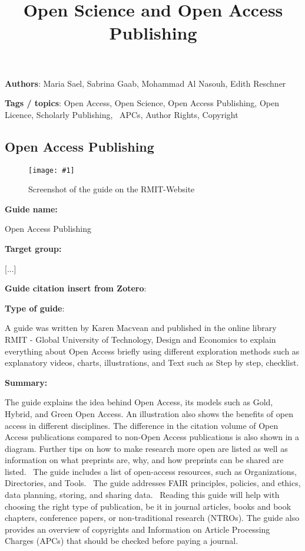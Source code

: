 \documentclass{article}
\newlength{\imgwidth}
\newcommand\scaledgraphics[2]{%
                
\settowidth{\imgwidth}{\texttt{[image: \#1]}}%
                
\setlength{\imgwidth}{\minof{\imgwidth}{#2\textwidth}}%
                
\texttt{[image: \#1]}%
                
}
\begin{document}
\title{Open Science and Open Access Publishing }

\maketitle





\textbf{Authors}: Maria Sael, Sabrina Gaab, Mohammad Al Nasouh, Edith Reschner


\textbf{Tags / topics}: Open Access, Open Science, Open Access Publishing, Open Licence, Scholarly Publishing,  APCs, Author Rights, Copyright





\subsection{Open Access Publishing}\label{H7151279}


\begin{figure}
\scaledgraphics{dec17709-06cd-4c04-b217-1e1f0b7a42cc.png}{1}
\caption*{Screenshot of the guide on the RMIT-Website}\label{F16639041}
\end{figure}




\textbf{Guide name:} 

Open Access Publishing


\textbf{Target group:}

[...]


\textbf{Guide citation insert from Zotero}:

\autocite{macvean_all_2021} 


\textbf{Type of guide}: 

A guide was written by Karen Macvean and published in the online library RMIT - Global University of Technology, Design and Economics to explain everything about Open Access briefly using different exploration methods such as explanatory videos, charts, illustrations, and Text such as Step by step, checklist. 


\textbf{Summary:} 

The guide explains the idea behind Open Access, its models such as Gold, Hybrid, and Green Open Access. An illustration also shows the benefits of open access in different disciplines. The difference in the citation volume of Open Access publications compared to non-Open Access publications is also shown in a diagram. Further tips on how to make research more open are listed as well as information on what preprints are, why, and how preprints can be shared are listed.  The guide includes a list of open-access resources, such as Organizations, Directories, and Tools.  The guide addresses FAIR principles, policies, and ethics, data planning, storing, and sharing data.  Reading this guide will help with choosing the right type of publication, be it in journal articles, books and book chapters, conference papers, or non-traditional research (NTROs). The guide also provides an overview of copyrights and Information on Article Processing Charges (APCs) that should be checked before paying a journal.
\end{document}
